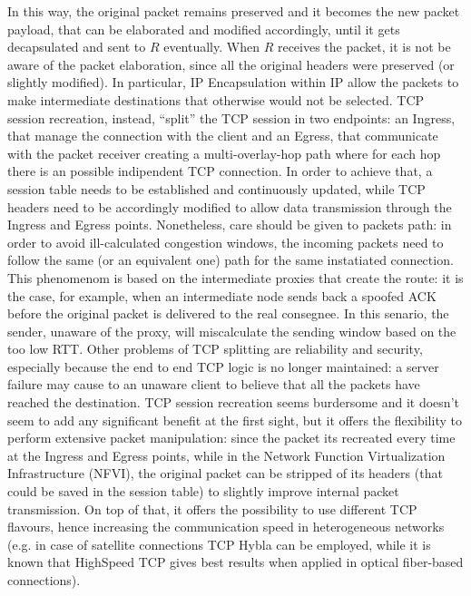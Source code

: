 \documentclass[10pt]{book}
\begin{document}
In this way, the original packet remains preserved and it becomes the new packet
payload, that can be elaborated and modified accordingly, until it gets 
decapsulated and sent to $R$ eventually. When $R$ receives the packet, it is 
not be aware of the packet elaboration, since all the original headers were 
preserved (or slightly modified). In particular, IP Encapsulation within IP 
allow the packets to make intermediate destinations that otherwise would not be 
selected.
TCP session recreation, instead, ``split'' the TCP session in two endpoints: an 
Ingress, that manage the connection with the client and an Egress, that 
communicate with the packet receiver creating a multi-overlay-hop path where 
for each hop there is an possible indipendent TCP connection. In order to 
achieve that, a session table needs to be established and continuously updated, 
while TCP headers need to be accordingly modified to allow data transmission 
through the Ingress and Egress points. Nonetheless, care should be given to 
packets path: in order to avoid ill-calculated congestion windows, the incoming 
packets need to follow the same (or an equivalent one) path for the same 
instatiated connection. This phenomenom is based on the intermediate proxies 
that create the route: it is the case, for example, when an intermediate node 
sends back a spoofed ACK before the original packet is delivered to the real 
consegnee. In this senario, the sender, unaware of the proxy, will miscalculate 
the sending window based on the too low RTT.
Other problems of TCP splitting are reliability and security, especially because
the end to end TCP logic is no longer maintained: a server failure may cause to
an unaware client to believe that all the packets have reached the destination.
TCP session recreation seems burdersome and it doesn't seem to add any
significant benefit at the first sight, but it offers the flexibility to perform
extensive packet manipulation: since the packet its recreated every time at the
Ingress and Egress points, while in the Network Function Virtualization
Infrastructure (NFVI), the original packet can be stripped of its headers (that
could be saved in the session table) to slightly improve internal packet
transmission.  On top of that, it
offers the possibility to use different TCP flavours, hence increasing the
communication speed in heterogeneous networks (e.g. in case of satellite
connections TCP Hybla can be employed, while it is known that HighSpeed TCP
gives best results when applied in optical fiber-based connections).
\end{document}
